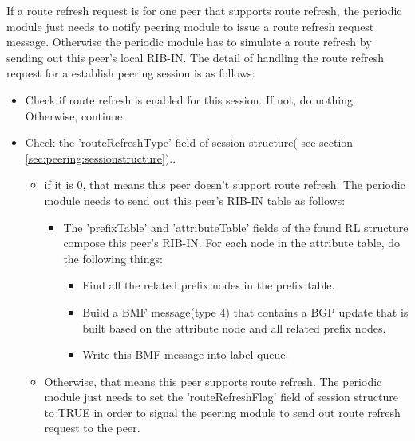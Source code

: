 If a route refresh request is for one peer that supports route refresh, the periodic module just needs to notify peering module to issue a route refresh request message. Otherwise the periodic module has to simulate a route refresh by sending out this peer's local RIB-IN. The detail of handling the route refresh request for a establish peering session is as follows:
\begin{itemize}
\item{ Check if route refresh is enabled for this session. If not, do nothing. Otherwise, continue. }
\item{ Check the 'routeRefreshType' field of session structure( see section \ref{sec:peering:sessionstructure})..}
	\begin{itemize}
 	\item{if it is 0, that means this peer doesn't support route refresh. The periodic module needs to send out this peer's RIB-IN table as follows:}
			\begin{itemize}
				\item{The 'prefixTable' and 'attributeTable' fields of the found RL structure compose this peer's RIB-IN. For each node in the attribute table, do the following things:}
					\begin{itemize}
						\item{Find all the related prefix nodes in the prefix table. }
						\item{Build a BMF message(type 4) that contains a BGP update that is built based on the attribute node and all related prefix nodes.}						
								\item{Write this BMF message into label queue.}
					\end{itemize}	
			\end{itemize}
	  \item{Otherwise, that means this peer supports route refresh. The periodic module just needs to set the 'routeRefreshFlag' field of session structure to TRUE in order to signal the peering module to send out route refresh request to the peer.}
 	\end{itemize}
\end{itemize}

